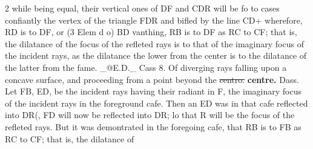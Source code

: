 \documentclass[10pt]{article}
\begin{document}
\begin{multicols}{2}
while being equal, their vertical ones of DF and CDR will be fo to cases confiantly the vertex of the triangle FDR and bifled by the line CD+ wherefore, RD is to DF, or (3 Elem d o) BD vanthing, RB is to DF as RC to CF; that is, the dilatance of the focus of the refleted rays is to that of the imaginary focus of the incident rays, as the dilatance the lower from the center is to the dilatance of the latter from the fame. \_@E.D.\_ Cass 8. Of diverging rays falling upon a concave surface, and proceeding from a point beyond the \sout{centro.} \textbf{centre.} Dass. Let FB, ED, be the incident rays having their radiant in F, the imaginary focus of the incident rays in the foreground cafe. Then an ED was in that cafe reflected into DR(, FD will now be reflected into DR; lo that R will be the focus of the refleted rays. But it was demontrated in the foregoing cafe, that RB is to FB as RC to CF; that is, the dilatance of


\end{multicols}
\end{document}
